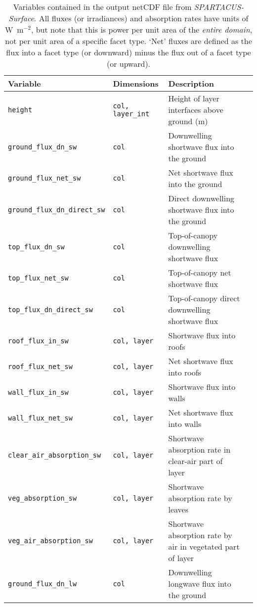 \documentclass[a4,oneside]{article}
\def\tablesetup{\rowcolors{2}{light-gray}{light-gray}\footnotesize}
\def\codetabsize{\footnotesize}
\def\spsurf{\emph{SPARTACUS-Surface}}
\def\codetab#1{{\codetabsize\texttt{#1}}}
\begin{document}
\begin{center}
\tablesetup
\begin{longtable}{llLp{7cm}}%
\caption{\label{tab:outvar}Variables contained in the output netCDF
  file from \spsurf.  All fluxes (or irradiances) and absorption rates
  have units of W~m$^{-2}$, but note that this is power per unit area
  of the \emph{entire domain}, not per unit area of a specific facet
  type.  `Net' fluxes are defined as the flux into a facet type (or downward) minus the
  flux out of a facet type (or upward).}\\
%
\hline
Variable & Dimensions & Description\\
\hline
\codetab{height} & \codetab{col, layer\_int} & Height of layer interfaces above ground (m)\\
\codetab{ground\_flux\_dn\_sw} & \codetab{col} & Downwelling shortwave flux into the ground \\
\codetab{ground\_flux\_net\_sw} & \codetab{col} & Net shortwave flux into the ground\\
\codetab{ground\_flux\_dn\_direct\_sw} & \codetab{col} & Direct downwelling shortwave flux into the ground\\
\codetab{top\_flux\_dn\_sw} & \codetab{col} & Top-of-canopy downwelling shortwave flux\\
\codetab{top\_flux\_net\_sw} & \codetab{col} & Top-of-canopy net shortwave flux\\
\codetab{top\_flux\_dn\_direct\_sw} & \codetab{col} & Top-of-canopy direct downwelling shortwave flux\\
\codetab{roof\_flux\_in\_sw} & \codetab{col, layer} & Shortwave flux into roofs \\
\codetab{roof\_flux\_net\_sw} & \codetab{col, layer} & Net shortwave flux into roofs\\
\codetab{wall\_flux\_in\_sw} & \codetab{col, layer} & Shortwave flux into walls\\
\codetab{wall\_flux\_net\_sw} & \codetab{col, layer} & Net shortwave flux into walls\\
\codetab{clear\_air\_absorption\_sw} & \codetab{col, layer} & Shortwave absorption rate in clear-air part of layer\\
\codetab{veg\_absorption\_sw} & \codetab{col, layer} & Shortwave absorption rate by leaves\\
\codetab{veg\_air\_absorption\_sw} & \codetab{col, layer} & Shortwave absorption rate by air in vegetated part of layer\\
\codetab{ground\_flux\_dn\_lw} & \codetab{col} & Downwelling longwave flux into the ground\\

\end{longtable}
\end{center}
\end{document}
